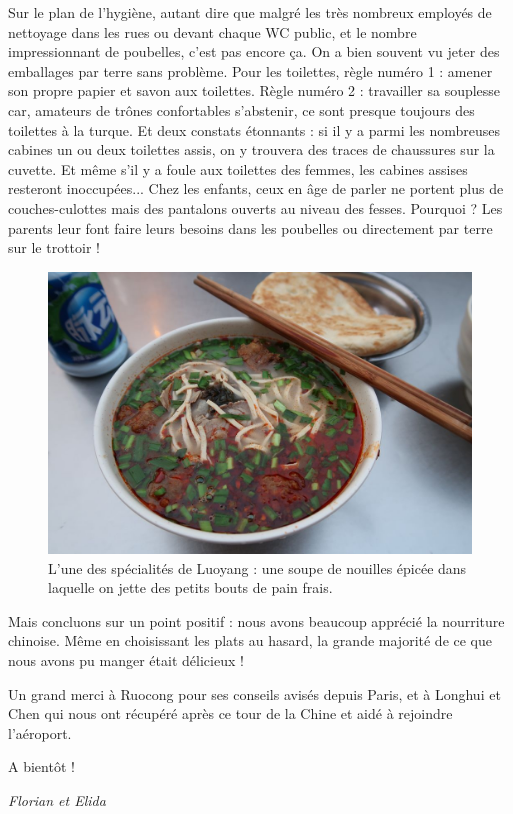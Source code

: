 Sur le plan de l'hygiène, autant dire que malgré les très nombreux
employés de nettoyage dans les rues ou devant chaque WC public, et le
nombre impressionnant de poubelles, c'est pas encore ça. On a bien
souvent vu jeter des emballages par terre sans problème. Pour les
toilettes, règle numéro 1 : amener son propre papier et savon aux
toilettes. Règle numéro 2 : travailler sa souplesse car, amateurs de
trônes confortables s'abstenir, ce sont presque toujours des toilettes à
la turque. Et deux constats étonnants : si il y a parmi les nombreuses
cabines un ou deux toilettes assis, on y trouvera des traces de
chaussures sur la cuvette. Et même s'il y a foule aux toilettes des
femmes, les cabines assises resteront inoccupées... Chez les enfants,
ceux en âge de parler ne portent plus de couches-culottes mais des
pantalons ouverts au niveau des fesses. Pourquoi ? Les parents leur font
faire leurs besoins dans les poubelles ou directement par terre sur le
trottoir !

\begin{figure}
\centering
\includegraphics{images/20180622_soupe.JPG}
\caption{L'une des spécialités de Luoyang : une soupe de nouilles épicée
dans laquelle on jette des petits bouts de pain frais.}
\end{figure}

Mais concluons sur un point positif : nous avons beaucoup apprécié la
nourriture chinoise. Même en choisissant les plats au hasard, la grande
majorité de ce que nous avons pu manger était délicieux !

Un grand merci à Ruocong pour ses conseils avisés depuis Paris, et à
Longhui et Chen qui nous ont récupéré après ce tour de la Chine et aidé
à rejoindre l'aéroport.

A bientôt !

\emph{Florian et Elida}

